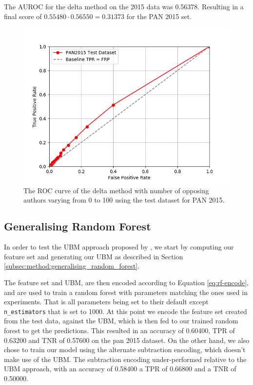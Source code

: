The \gls{AUROC} for the delta method on the 2015 data was 0.56378. Resulting
in a final score of $0.55480 \cdot 0.56550 = 0.31373$ for the PAN 2015 set.

\begin{figure}
    \centering
    \includegraphics[width=.7\textwidth]{./pictures/delta_method_roc.png}
    \caption{The ROC curve of the delta method with number of opposing authors
    varying from 0 to 100 using the test dataset for PAN 2015.}
    \label{fig:delta_method_roc}
\end{figure}

\subsection{Generalising Random Forest} \label{subsec:results:generalising_random_forest}
In order to test the \gls{UBM} approach proposed by \cite{pacheco2015}, we start
by computing our feature set and generating our \gls{UBM} as described in
Section \ref{subsec:method:generalising_random_forest}.

The feature set and \gls{UBM}, are then encoded according to Equation
\eqref{eq:rf-encode}, and are used to train a random forest with parameters
matching the ones used in experiments. That is all parameters being set to their
default except \texttt{n\_estimators} that is set to 1000. At this point we
encode the feature set created from the test data, against the \gls{UBM}, which
is then fed to our trained random forest to get the predictions. This resulted
in an accuracy of 0.60400, \gls{TPR} of 0.63200 and \gls{TNR} of 0.57600 on the
pan 2015 dataset. On the other hand, we also chose to train our model using the
alternate subtraction encoding, which doesn't make use of the \gls{UBM}. The
subtraction encoding under-performed relative to the \gls{UBM} approach, with an
accuracy of 0.58400 a \gls{TPR} of 0.66800 and a \gls{TNR} of 0.50000.

